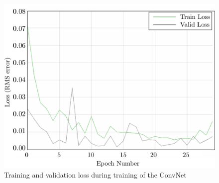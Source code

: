 \documentclass[11pt]{article}
\begin{document}
\begin{figure}
\begin{center}
\includegraphics[width=20 pc]{./../poster/Figures/trainloss}
\caption{Training and validation loss during training of the ConvNet}
\label{fig:trainloss}
\end{center}
\end{figure}



\end{document}
